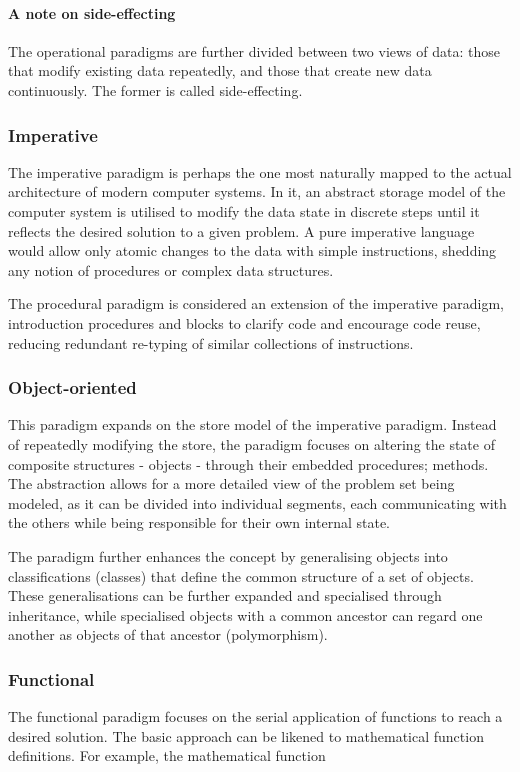 \paragraph*{A note on side-effecting}
The operational paradigms are further divided between two views of data: those that modify existing data repeatedly, and those that create new data continuously. The former is called side-effecting.

\subsubsection*{Imperative}
The imperative paradigm is perhaps the one most naturally mapped to the actual architecture of modern computer systems. In it, an abstract storage model of the computer system is utilised to modify the data state in discrete steps until it reflects the desired solution to a given problem. A pure imperative language would allow only atomic changes to the data with simple instructions, shedding any notion of procedures or complex data structures.

The procedural paradigm is considered an extension of the imperative paradigm, introduction procedures and blocks to clarify code and encourage code reuse, reducing redundant re-typing of similar collections of instructions.

\subsubsection*{Object-oriented}
This paradigm expands on the store model of the imperative paradigm. Instead of repeatedly modifying the store, the paradigm focuses on altering the state of composite structures - objects - through their embedded procedures; methods. The abstraction allows for a more detailed view of the problem set being modeled, as it can be divided into individual segments, each communicating with the others while being responsible for their own internal state.

The paradigm further enhances the concept by generalising objects into classifications (classes) that define the common structure of a set of objects. These generalisations can be further expanded and specialised through inheritance, while specialised objects with a common ancestor can regard one another as objects of that ancestor (polymorphism).

\subsubsection*{Functional}
The functional paradigm focuses on the serial application of functions to reach a desired solution. The basic approach can be likened to mathematical function definitions. For example, the mathematical function


